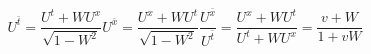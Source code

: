 \documentclass{report}
\theoremstyle{definition}
\begin{document}
\begin{chapter2}\label{prob: 16}
	\begin{subequations}
		\begin{equation}
			U^{\bar t} = \frac{U^{t} + WU^{x}}{\sqrt{1-W^{2}}} 
		\end{equation}
		\begin{equation}
			U^{\bar x} = \frac{U^{x} + WU^{t}}{\sqrt{1-W^{2}}}
		\end{equation}
		\begin{equation}
			\frac{U^{\bar x}}{U^{\bar t}} = \frac{U^{x} + WU^{t}}{U^{t} + WU^{x}} = \frac{v + W}{1 + vW}
		\end{equation}
	\end{subequations}
\end{chapter2}

\begin{chapter2}\label{prob: 17}

\end{chapter2}

\begin{chapter2}\label{prob: 18}
	
\end{chapter2}
\end{document}
